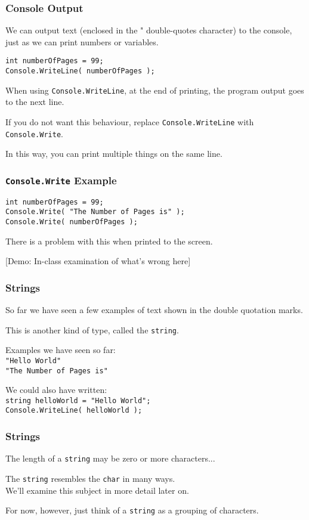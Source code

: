 \begin{frame}
\frametitle{Console Output}

We can output text (enclosed in the " double-quotes character) to the console, just as we can print numbers or variables.

\texttt{int numberOfPages = 99;}\\
\texttt{Console.WriteLine( numberOfPages );}

When using \texttt{Console.WriteLine}, at the end of printing, the program output goes to the next line.

If you do not want this behaviour, replace \texttt{Console.WriteLine} with \texttt{Console.Write}.

In this way, you can print multiple things on the same line.

\end{frame}

\begin{frame}
\frametitle{\texttt{Console.Write} Example}

\texttt{int numberOfPages = 99;}\\
\texttt{Console.Write( "The Number of Pages is" );}\\
\texttt{Console.Write( numberOfPages );}

There is a problem with this when printed to the screen.

[Demo: In-class examination of what's wrong here]

\end{frame}

\begin{frame}
\frametitle{Strings}
So far we have seen a few examples of text shown in the double quotation marks.

This is another kind of type, called the \alert{\texttt{string}}.

Examples we have seen so far:\\
\texttt{"Hello World"}\\
\texttt{"The Number of Pages is"}

We could also have written:\\
\texttt{string helloWorld = "Hello World";}\\
\texttt{Console.WriteLine( helloWorld );}

\end{frame}

\begin{frame}
\frametitle{Strings}
The length of a \texttt{string} may be zero or more characters...

The \texttt{string} resembles the \texttt{char} in many ways.\\
\quad We'll examine this subject in more detail later on.

For now, however, just think of a \texttt{string} as a grouping of characters.

\end{frame}


